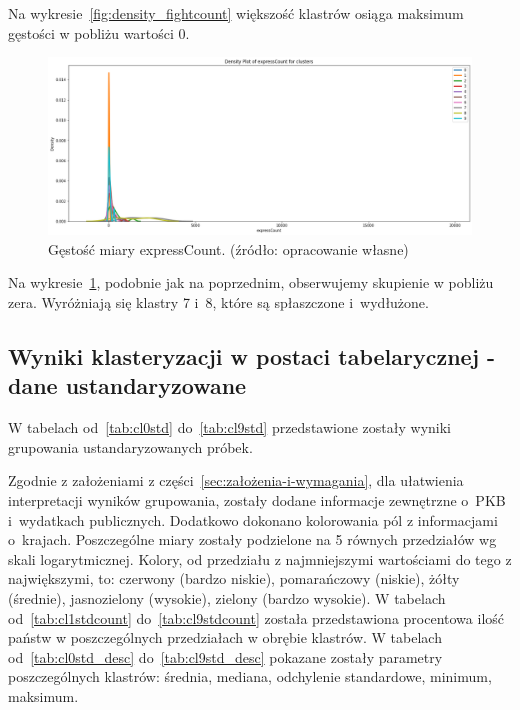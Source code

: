 \documentclass[11pt]{report}
\begin{document}
    Na wykresie~\ref{fig:density_fightcount} większość klastrów osiąga maksimum gęstości w pobliżu wartości 0.

    \begin{figure}[!htp]
        \centering
        \includegraphics[width=\linewidth]{fig/CLUST/density_expressCount.png}
        \caption{Gęstość miary expressCount. (źródło: opracowanie własne)}
        \label{fig:density_expresscount}
    \end{figure}

    Na wykresie~\ref{fig:density_expresscount}, podobnie jak na poprzednim, obserwujemy skupienie w pobliżu zera.
    Wyróżniają się klastry 7 i~8, które są spłaszczone i~wydłużone.

    \subsection{Wyniki klasteryzacji w postaci tabelarycznej - dane ustandaryzowane}
    W tabelach od~\ref{tab:cl0std} do~\ref{tab:cl9std} przedstawione zostały wyniki grupowania ustandaryzowanych próbek.

    Zgodnie z założeniami z części~\ref{sec:założenia-i-wymagania}, dla ułatwienia interpretacji wyników grupowania, zostały dodane informacje zewnętrzne o~PKB i~wydatkach publicznych.
    Dodatkowo dokonano kolorowania pól z informacjami o~krajach.
    Poszczególne miary zostały podzielone na 5 równych przedziałów wg skali logarytmicznej.
    Kolory, od przedziału z najmniejszymi wartościami do tego z największymi, to: czerwony (bardzo niskie), pomarańczowy (niskie), żółty (średnie), jasnozielony (wysokie), zielony (bardzo wysokie).
    W tabelach od~\ref{tab:cl1stdcount} do~\ref{tab:cl9stdcount} została przedstawiona procentowa ilość państw w poszczególnych przedziałach w obrębie klastrów.
    W tabelach od~\ref{tab:cl0std_desc} do~\ref{tab:cl9std_desc} pokazane zostały parametry poszczególnych klastrów: średnia, mediana, odchylenie standardowe, minimum, maksimum.
\end{document}
